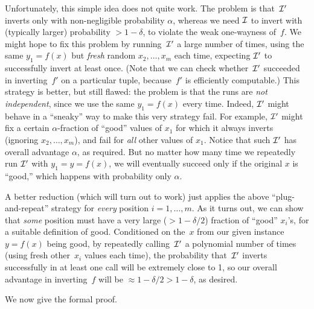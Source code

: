 \documentclass[11pt]{article}
\begin{document}
Unfortunately, this simple idea does not quite work.  The problem is
that~$\mathcal{I}'$ inverts only with non-negligible probability $\alpha$,
whereas we need $\mathcal{I}$ to invert with (typically larger) probability
$> 1-\delta$, to violate the weak one-wayness of~$f$.  We might hope
to fix this problem by running~$\mathcal{I}'$ a large number of times, using
the same $y_{1} = f(x)$ but \emph{fresh} random $x_{2}, \ldots, x_{m}$
each time, expecting $\mathcal{I}'$ to successfully invert at least once.
(Note that we can check whether~$\mathcal{I}'$ succeeded in inverting~$f'$ on
a particular tuple, because~$f'$ is efficiently computable.)  This
strategy is better, but still flawed: the problem is that the runs are
\emph{not independent}, since we use the same $y_{1} = f(x)$ every
time.  Indeed, $\mathcal{I}'$ might behave in a ``sneaky'' way to make this
very strategy fail.  For example, $\mathcal{I}'$ might fix a certain
$\alpha$-fraction of ``good'' values of $x_{1}$ for which it always
inverts (ignoring $x_{2}, \ldots, x_{m}$), and fail for \emph{all}
other values of $x_{1}$.  Notice that such $\mathcal{I}'$ has overall
advantage $\alpha$, as required.  But no matter how many time we
repeatedly run $\mathcal{I}'$ with $y_{1}=y=f(x)$, we will eventually succeed
only if the original $x$ is ``good,'' which happens with probability
only $\alpha$.

A better reduction (which will turn out to work) just applies the
above ``plug-and-repeat'' strategy for \emph{every} position
$i = 1, \ldots, m$.  As it turns out, we can show that \emph{some}
position must have a very large ($> 1-\delta/2$) fraction of ``good''
$x_{i}$'s, for a suitable definition of good.  Conditioned on the~$x$
from our given instance $y = f(x)$ being good, by repeatedly
calling~$\mathcal{I}'$ a polynomial number of times (using fresh
other~$x_{i}$ values each time), the probability that~$\mathcal{I}'$ inverts
successfully in at least one call will be extremely close to 1, so our
overall advantage in inverting~$f$ will be
$\approx 1-\delta/2 > 1-\delta$, as desired.

We now give the formal proof.
\end{document}
